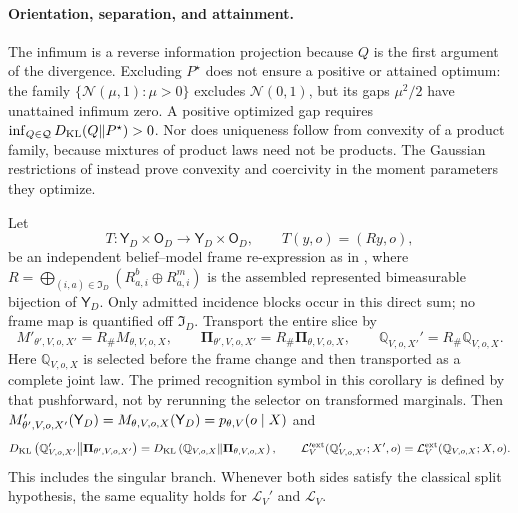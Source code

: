 \paragraph{Orientation, separation, and attainment.}
The infimum is a reverse information projection because \(Q\) is the first
argument of the divergence. Excluding \(P^\star\) does not ensure a positive
or attained optimum: the family
\(\{\mathcal N(\mu,1):\mu>0\}\) excludes \(\mathcal N(0,1)\), but its gaps
\(\mu^2/2\) have unattained infimum zero. A positive optimized gap requires
\(\inf_{Q\in\mathcal Q}D_{\mathrm{KL}}(Q\Vert P^\star)>0\). Nor does uniqueness follow
from convexity of a product family, because mixtures of product laws need
not be products. The Gaussian restrictions of 
instead prove convexity and coercivity in the moment parameters they
optimize. 

Let
\[
T:\mathsf Y_D\times\mathsf O_D\longrightarrow
\mathsf Y_D\times\mathsf O_D,
\qquad
T(y,o)=(Ry,o),
\]
be an independent belief--model frame re-expression as in
, where
\(R=\bigoplus_{(i,a)\in\mathfrak I_D}
(R_{a,i}^b\oplus R_{a,i}^m)\) is the assembled represented bimeasurable
bijection of \(\mathsf Y_D\). Only admitted incidence blocks occur in this
direct sum; no frame map is quantified off \(\mathfrak I_D\). Transport the
entire slice by
\[
M'_{\theta',V,o,X'}=R_{\#}M_{\theta,V,o,X},
\qquad
\boldsymbol\Pi_{\theta',V,o,X'}
=R_{\#}\boldsymbol\Pi_{\theta,V,o,X},
\qquad
\mathbb Q_{V,o,X'}'
=R_{\#}\mathbb Q_{V,o,X}.
\]
Here \(\mathbb Q_{V,o,X}\) is selected before the frame change and then
transported as a complete joint law. The primed recognition symbol in this
corollary is defined by that pushforward, not by rerunning the selector on
transformed marginals.
Then
\(M'_{\theta',V,o,X'}(\mathsf Y_D)
=M_{\theta,V,o,X}(\mathsf Y_D)
=p_{\theta,V}(o\mid X)\)
and
\begin{equation}
D_{\mathrm{KL}}\left(
\mathbb Q_{V,o,X'}'
\middle\Vert
\boldsymbol\Pi_{\theta',V,o,X'}
\right)
=D_{\mathrm{KL}}\left(
\mathbb Q_{V,o,X}
\middle\Vert
\boldsymbol\Pi_{\theta,V,o,X}
\right),
\qquad
\mathcal L_V'^{\mathrm{ext}}(\mathbb Q_{V,o,X'}';X',o)
=\mathcal L_V^{\mathrm{ext}}(\mathbb Q_{V,o,X};X,o).
\label{eq:elbo-gauge-invariance}
\end{equation}
This includes the singular branch. Whenever both sides satisfy the classical split hypothesis, the same equality holds for \(\mathcal L_V'\) and \(\mathcal L_V\).

